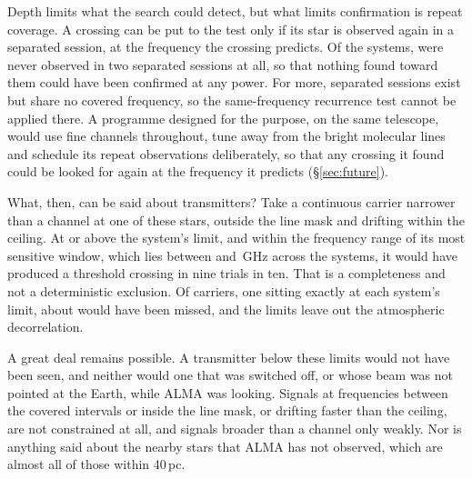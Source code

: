 Depth limits what the search could detect, but what limits confirmation is
repeat coverage. A crossing can be put to the test only if its star is observed
again in a separated session, at the frequency the crossing predicts. Of the
\NSysClassA{} systems, \ZcNoRepNoSep{} were never observed in two separated
sessions at all, so that nothing found toward them could have been confirmed
at any power. For \ZcNoRepNoFreqWord{} more, separated sessions exist but
share no covered frequency, so the same-frequency recurrence test cannot be
applied there. A programme designed for the purpose, on the same telescope,
would use fine channels throughout, tune away from the bright molecular
lines and schedule its repeat observations deliberately, so that any
crossing it found could be looked for again at the frequency it predicts
(\S\ref{sec:future}).

What, then, can be said about transmitters? Take a continuous carrier
narrower than a channel at one of these stars, outside the line mask and
drifting within the ceiling. At or above the system's limit, and within the
frequency range of its most sensitive window, which lies between
\NtBestNuLo{} and \NtBestNuHi\,GHz across the systems, it would have
produced a threshold crossing in nine trials in ten. That is a completeness and not a
deterministic exclusion. Of \NSysALimSum{} carriers, one sitting exactly at
each system's limit, about \NtMissAtLimWord{} would have been missed, and the
limits leave out the atmospheric decorrelation.

A great deal remains possible. A transmitter below these limits would not have been seen,
and neither would one that was switched off, or whose beam was not pointed
at the Earth, while ALMA was looking. Signals at frequencies between the
covered intervals or inside the line mask, or drifting faster than the
ceiling, are not constrained at all, and signals broader than a channel only
weakly. Nor is anything said
about the nearby stars that ALMA has not observed, which are almost all of
those within 40\,pc.


